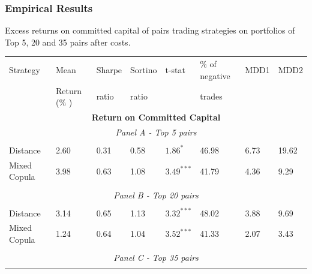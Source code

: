 \documentclass[pdf,9pt,xcolor=dvipsnames,hide notes]{beamer}
\begin{document}
	\begin{frame}
		
		
		\frametitle{Empirical Results}
			\begin{threeparttable}[H]
			\centering \tiny
			\caption{Excess returns on committed capital of pairs trading strategies on portfolios of Top 5, 20 and 35 pairs after costs. }
			\begin{tabularx}{\textwidth}{@{\extracolsep{\fill}}llllllll@{}}
				\toprule
				Strategy & Mean  & Sharpe & Sortino & t-stat & \% of negative   & MDD1 & MDD2 \\
				& Return (\% ) & ratio &  ratio     &  &  trades     &       &  \\
				\midrule
				\multicolumn{8}{c}{\textbf{Return on Committed Capital}} \\
				\multicolumn{8}{c}{\textit{Panel A - Top 5 pairs}} \\
				&       &       &       &       &       &       &  \\
				Distance & 2.60  & 0.31  & 0.58  & $1.86^{*}$  & 46.98 & 6.73    & 19.62 \\
				Mixed Copula & \cellcolor{corn} 3.98  & \cellcolor{corn} 0.63  & 1.08  & \cellcolor{corn} $3.49^{***}$  & \cellcolor{corn} 41.79 & \cellcolor{corn} 4.36  & \cellcolor{corn} 9.29 \\
				\multicolumn{1}{r}{} & \multicolumn{1}{r}{} & \multicolumn{1}{r}{} & \multicolumn{1}{r}{} & \multicolumn{1}{r}{} & \multicolumn{1}{r}{} & \multicolumn{1}{r}{} & \multicolumn{1}{r}{} \\
				\multicolumn{8}{c}{\textit{Panel B - Top 20 pairs}} \\
				&       &       &       &       &       &       &  \\
				Distance & \cellcolor{celadon} 3.14  & \cellcolor{celadon} 0.65  & 1.13  & $3.32^{***}$  & 48.02 & 3.88  & 9.69 \\
				Mixed Copula  & 1.24  & 0.64  & 1.04  & $3.52^{***}$  & 41.33 & \cellcolor{corn} 2.07  & \cellcolor{corn} 3.43  \\
				\multicolumn{1}{r}{} & \multicolumn{1}{r}{} & \multicolumn{1}{r}{} & \multicolumn{1}{r}{} & \multicolumn{1}{r}{} & \multicolumn{1}{r}{} & \multicolumn{1}{r}{} & \multicolumn{1}{r}{} \\
				\multicolumn{8}{c}{\textit{Panel C - Top 35 pairs}} \\
				&       &       &       &       &       &       &  \\

\end{tabularx}
\end{threeparttable}
\end{frame}
\end{document}
